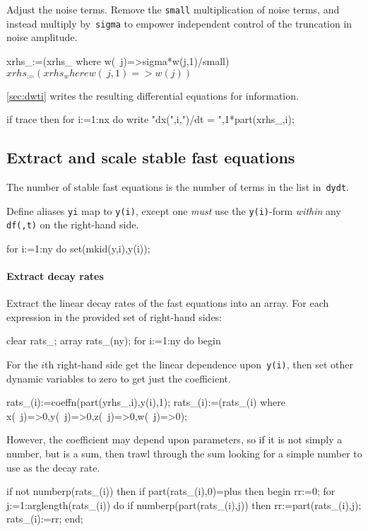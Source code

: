 \documentclass[11pt,a5paper]{article}
\begin{document}
Adjust the noise terms. Remove the \verb|small|
multiplication of noise terms, and instead multiply
by~\verb|sigma| to empower independent control of the
truncation in noise amplitude.
\begin{reduce}
xrhs_:=(xrhs_ where w(~j)=>sigma*w(j,1)/small)$
xrhs_:=(xrhs_ where w(~j,1)=>w(j))$
\end{reduce}

\cref{sec:dwti} writes the resulting differential
equations for information.
\begin{reduce}
if trace then for i:=1:nx do 
    write "dx(",i,")/dt = ",1*part(xrhs_,i);
\end{reduce}


\subsection{Extract and scale stable fast equations}

The number of stable fast equations is the number of terms
in the list in~\verb|dydt|.
Define aliases \verb|yi| map to \verb|y(i)|, except one 
\emph{must} use the \verb|y(i)|-form \emph{within} any 
\verb|df(,t)| on the right-hand side.
\begin{reduce}
for i:=1:ny do set(mkid(y,i),y(i));
\end{reduce}

\paragraph{Extract decay rates}
Extract the linear decay rates of the fast equations into an
array. For each expression in the provided set of right-hand
sides:
\begin{reduce}
clear rats_; array rats_(ny);
for i:=1:ny do begin
\end{reduce}

For the $i$th right-hand side get the linear dependence
upon~\verb|y(i)|, then set other dynamic variables to zero
to get just the coefficient.
\begin{reduce}
  rats_(i):=coeffn(part(yrhs_,i),y(i),1);
  rats_(i):=(rats_(i) where 
      {x(~j)=>0,y(~j)=>0,z(~j)=>0,w(~j)=>0});
\end{reduce}

However, the coefficient may depend upon parameters, so if
it is not simply a number, but is a sum, then trawl through
the sum looking for a simple number to use as the decay
rate.
\begin{reduce}
  if not numberp(rats_(i)) then 
  if part(rats_(i),0)=plus then begin
    rr:=0;
    for j:=1:arglength(rats_(i)) do 
      if numberp(part(rats_(i),j)) 
      then rr:=part(rats_(i),j);
    rats_(i):=rr;
  end;
\end{reduce}
\end{document}
